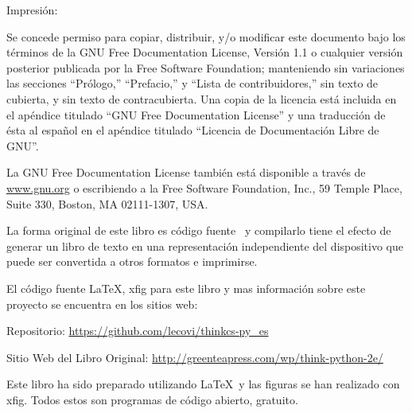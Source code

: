 {\scriptsize{} %


{\scriptsize{} Impresión: \Fecha}

\newpage{}

\thispagestyle{empty} \vspace{0.25in}

Se concede permiso para copiar, distribuir, y/o modificar este documento
bajo los términos de la GNU Free Documentation License, Versión 1.1
o cualquier versión posterior publicada por la Free Software Foundation;
manteniendo sin variaciones las secciones ``Prólogo,'' ``Prefacio,''
y ``Lista de contribuidores,'' sin texto de cubierta, y sin texto
de contracubierta. Una copia de la licencia está incluida en el apéndice
titulado ``GNU Free Documentation License'' y una traducción de
ésta al español en el apéndice titulado ``Licencia de Documentación
Libre de GNU''.

La GNU Free Documentation License también está disponible a través
de \url{www.gnu.org} o escribiendo a la Free Software Foundation,
Inc., 59 Temple Place, Suite 330, Boston, MA 02111-1307, USA.

La forma original de este libro es código fuente \LyX{}\ y compilarlo
tiene el efecto de generar un libro de texto en una representación
independiente del dispositivo que puede ser convertida a otros formatos
e imprimirse.

El código fuente \LaTeX{}, xfig para este libro y mas información
sobre este proyecto se encuentra en los sitios web:

Repositorio: \url{https://github.com/lecovi/thinkcs-py_es}

Sitio Web del Libro Original: \url{http://greenteapress.com/wp/think-python-2e/}

Este libro ha sido preparado utilizando \LaTeX{}\ y las figuras se han realizado con xfig.
Todos estos son programas de código abierto, gratuito.

\vspace{0.25in}

\newpage{}

\thispagestyle{empty}

}
